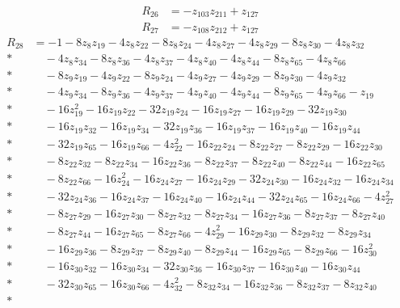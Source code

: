 \begin{align*}
R_{26}&=-z_{103} z_{211}+z_{127}
\end{align*}
\begin{align*}
R_{27}&=-z_{108} z_{212}+z_{127}
\end{align*}
\begin{align*}
R_{28}&=-1-8z_{8} z_{19}-4z_{8} z_{22}-8z_{8} z_{24}-4z_{8} z_{27}-4z_{8} z_{29}-8z_{8} z_{30}-4z_{8} z_{32}\\*
&\quad{}-4z_{8} z_{34}-8z_{8} z_{36}-4z_{8} z_{37}-4z_{8} z_{40}-4z_{8} z_{44}-8z_{8} z_{65}-4z_{8} z_{66}\\*
&\quad{}-8z_{9} z_{19}-4z_{9} z_{22}-8z_{9} z_{24}-4z_{9} z_{27}-4z_{9} z_{29}-8z_{9} z_{30}-4z_{9} z_{32}\\*
&\quad{}-4z_{9} z_{34}-8z_{9} z_{36}-4z_{9} z_{37}-4z_{9} z_{40}-4z_{9} z_{44}-8z_{9} z_{65}-4z_{9} z_{66}-z_{19}\\*
&\quad{}-16z_{19}^{2}-16z_{19} z_{22}-32z_{19} z_{24}-16z_{19} z_{27}-16z_{19} z_{29}-32z_{19} z_{30}\\*
&\quad{}-16z_{19} z_{32}-16z_{19} z_{34}-32z_{19} z_{36}-16z_{19} z_{37}-16z_{19} z_{40}-16z_{19} z_{44}\\*
&\quad{}-32z_{19} z_{65}-16z_{19} z_{66}-4z_{22}^{2}-16z_{22} z_{24}-8z_{22} z_{27}-8z_{22} z_{29}-16z_{22} z_{30}\\*
&\quad{}-8z_{22} z_{32}-8z_{22} z_{34}-16z_{22} z_{36}-8z_{22} z_{37}-8z_{22} z_{40}-8z_{22} z_{44}-16z_{22} z_{65}\\*
&\quad{}-8z_{22} z_{66}-16z_{24}^{2}-16z_{24} z_{27}-16z_{24} z_{29}-32z_{24} z_{30}-16z_{24} z_{32}-16z_{24} z_{34}\\*
&\quad{}-32z_{24} z_{36}-16z_{24} z_{37}-16z_{24} z_{40}-16z_{24} z_{44}-32z_{24} z_{65}-16z_{24} z_{66}-4z_{27}^{2}\\*
&\quad{}-8z_{27} z_{29}-16z_{27} z_{30}-8z_{27} z_{32}-8z_{27} z_{34}-16z_{27} z_{36}-8z_{27} z_{37}-8z_{27} z_{40}\\*
&\quad{}-8z_{27} z_{44}-16z_{27} z_{65}-8z_{27} z_{66}-4z_{29}^{2}-16z_{29} z_{30}-8z_{29} z_{32}-8z_{29} z_{34}\\*
&\quad{}-16z_{29} z_{36}-8z_{29} z_{37}-8z_{29} z_{40}-8z_{29} z_{44}-16z_{29} z_{65}-8z_{29} z_{66}-16z_{30}^{2}\\*
&\quad{}-16z_{30} z_{32}-16z_{30} z_{34}-32z_{30} z_{36}-16z_{30} z_{37}-16z_{30} z_{40}-16z_{30} z_{44}\\*
&\quad{}-32z_{30} z_{65}-16z_{30} z_{66}-4z_{32}^{2}-8z_{32} z_{34}-16z_{32} z_{36}-8z_{32} z_{37}-8z_{32} z_{40}\\*

\end{align*}

